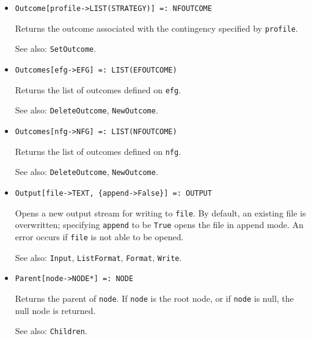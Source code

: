 \begin{itemize}
\item{}
\protect \large \begin{verbatim}
Outcome[profile->LIST(STRATEGY)] =: NFOUTCOME 
\end{verbatim}\normalsize

\bd
Returns the outcome associated with the contingency specified by
\verb+profile+.
\item [See also:] \verb+SetOutcome+.
\ed

\item{}
\protect \large \begin{verbatim}
Outcomes[efg->EFG] =: LIST(EFOUTCOME) 
\end{verbatim}\normalsize

\bd
Returns the list of outcomes defined on \verb+efg+.
\item [See also:] \verb+DeleteOutcome+, \verb+NewOutcome+.
\ed

\item{}
\protect \large \begin{verbatim}
Outcomes[nfg->NFG] =: LIST(NFOUTCOME) 
\end{verbatim}\normalsize

\bd
Returns the list of outcomes defined on \verb+nfg+.
\item [See also:] \verb+DeleteOutcome+, \verb+NewOutcome+.
\ed

\item{}
\protect \large \begin{verbatim}
Output[file->TEXT, {append->False}] =: OUTPUT 
\end{verbatim}\normalsize

\bd
Opens a new output stream for writing to \verb+file+.  By default,
an existing file is overwritten; specifying \verb+append+ to be \verb+True+
opens the file in append mode.  An error occurs if \verb+file+ is not
able to be opened.
\item [See also:] \verb+Input+, \verb+ListFormat+, \verb+Format+,
\verb+Write+.
\ed


\item{}
\protect \large \begin{verbatim}
Parent[node->NODE*] =: NODE 
\end{verbatim}\normalsize

\bd
Returns the parent of \verb+node+.  If \verb+node+ is the root node,
or if \verb+node+ is null, the null node is returned.
\item [See also:] \verb+Children+.
\ed


\end{itemize}
